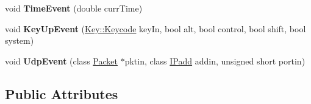 \begin{DoxyCompactItemize}
void {\bfseries Time\+Event} (double curr\+Time)
\item 
\hypertarget{class_player_a5f4e16ffd07d713353123f5778f1d9b6}{}\label{class_player_a5f4e16ffd07d713353123f5778f1d9b6} 
void {\bfseries Key\+Up\+Event} (\hyperlink{class_key_handler_1_1_key_a832541e186986ff9f6bd5a810ed5c164}{Key\+::\+Keycode} key\+In, bool alt, bool control, bool shift, bool system)
\item 
\hypertarget{class_player_a5feaecbb7796f319449f2fd7abd7c226}{}\label{class_player_a5feaecbb7796f319449f2fd7abd7c226} 
void {\bfseries Udp\+Event} (class \hyperlink{class_packet}{Packet} $\ast$pktin, class \hyperlink{class_i_padd}{I\+Padd} addin, unsigned short portin)
\end{DoxyCompactItemize}
\subsection*{Public Attributes}
